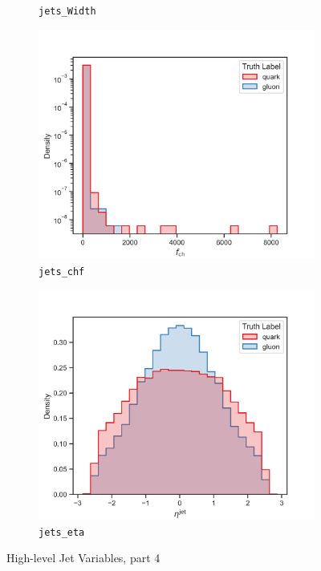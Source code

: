 \begin{figure}[!htb]
\begin{subfigure}[t]{0.48\textwidth}
		\caption{\texttt{jets\_Width}}
		\label{fig:highlevel_21}
	\end{subfigure}
	\begin{subfigure}[t]{0.48\textwidth}
		\includegraphics[width=1\textwidth]{src/plots/distributions/highlevel/jets_chf.png}
		\caption{\texttt{jets\_chf}}
		\label{fig:highlevel_22}
	\end{subfigure}
	\begin{subfigure}[t]{0.48\textwidth}
		\includegraphics[width=1\textwidth]{src/plots/distributions/highlevel/jets_eta.png}
		\caption{\texttt{jets\_eta}}
		\label{fig:highlevel_23}
	\end{subfigure}
\caption{High-level Jet Variables, part 4}
\label{fig:highlevel_18-23}
\end{figure}

